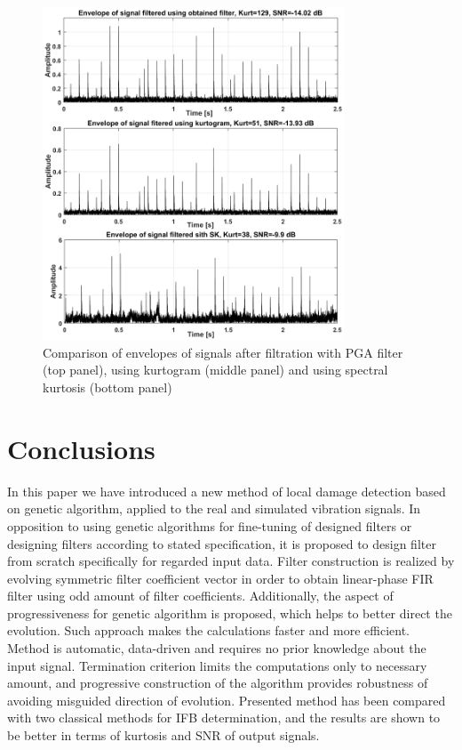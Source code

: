 \documentclass[preprint,12pt]{elsarticle}
\begin{document}
\begin{figure}[ht!]
\centering
\includegraphics[width=0.8\textwidth]{wykresy/comp.png}
\caption{Comparison of envelopes of signals after filtration with PGA filter (top panel), using kurtogram (middle panel) and using spectral kurtosis (bottom panel)}
\label{fig:comp}
\end{figure}


\section{Conclusions}

In this paper we have introduced a new method of local damage detection based on genetic algorithm, applied to the real and simulated vibration signals. In opposition to using genetic algorithms for fine-tuning of designed filters or designing filters according to stated specification, it is proposed to design filter from scratch specifically for regarded input data. Filter construction is realized by evolving symmetric filter coefficient vector in order to obtain linear-phase FIR filter using odd amount of filter coefficients. Additionally, the aspect of progressiveness for genetic algorithm is proposed, which helps to better direct the evolution. Such approach makes the calculations faster and more efficient. Method is automatic, data-driven and requires no prior knowledge about the input signal. Termination criterion limits the computations only to necessary amount, and progressive construction of the algorithm provides robustness of avoiding misguided direction of evolution. Presented method has been compared with two classical methods for IFB determination, and the results are shown to be better in terms of kurtosis and SNR of output signals.
\end{document}
